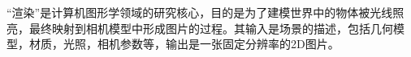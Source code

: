 “渲染”是计算机图形学领域的研究核心，目的是为了建模世界中的物体被光线照亮，最终映射到相机模型中形成图片的过程。其输入是场景的描述，包括几何模型，材质，光照，相机参数等，输出是一张固定分辨率的2D图片。